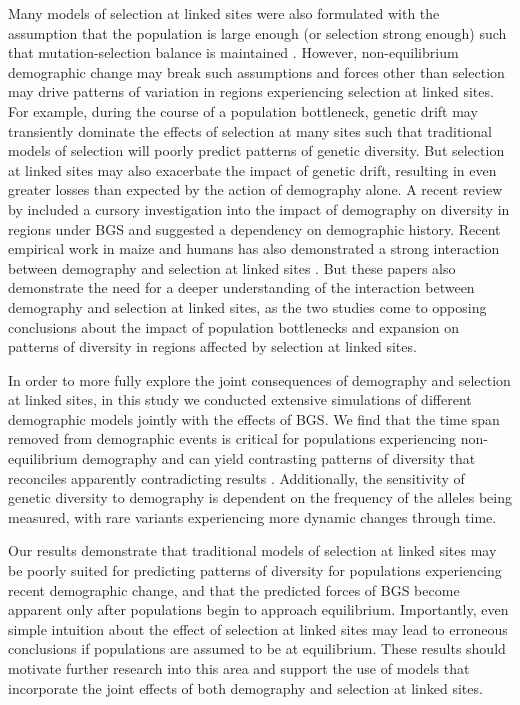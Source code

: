 \documentclass[9pt,twocolumn,twoside]{rilabRxiv}
\begin{document}
Many models of selection at linked sites were also formulated with the assumption that the population is large enough (or selection strong enough) such that mutation-selection balance is maintained \citep{charlesworth1993effect, zeng2013coalescent, nicolaisen2013distortions}.
However, non-equilibrium demographic change may break such assumptions and forces other than selection may drive patterns of variation in regions experiencing selection at linked sites.
For example, during the course of a population bottleneck, genetic drift may transiently dominate the effects of selection at many sites such that traditional models of selection will poorly predict patterns of genetic diversity.
But selection at linked sites may also exacerbate the impact of genetic drift, resulting in even greater losses than expected by the action of demography alone.
A recent review by \citet{comeron2017background} included a cursory investigation into the impact of demography on diversity in regions under BGS and suggested a dependency on demographic history.
Recent empirical work in maize and humans has also demonstrated a strong interaction between demography and selection at linked sites \citep{beissinger2016recent,torres2018human}.
But these papers also demonstrate the need for a deeper understanding of the interaction between demography and selection at linked sites, as the two studies come to opposing conclusions about the impact of population bottlenecks and expansion on patterns of diversity in regions affected by selection at linked sites.

In order to more fully explore the joint consequences of demography and selection at linked sites, in this study we conducted extensive simulations of different demographic models jointly with the effects of BGS.
We find that the time span removed from demographic events is critical for populations experiencing non-equilibrium demography and can yield contrasting patterns of diversity that reconciles apparently contradicting results  \citep{beissinger2016recent,torres2018human}.
Additionally, the sensitivity of genetic diversity to demography is dependent on the frequency of the alleles being measured, with rare variants experiencing more dynamic changes through time.

Our results demonstrate that traditional models of selection at linked sites may be poorly suited for predicting patterns of diversity for populations experiencing recent demographic change, and that the predicted forces of BGS become apparent only after populations begin to approach equilibrium.
Importantly, even simple intuition about the effect of selection at linked sites may lead to erroneous conclusions if populations are assumed to be at equilibrium.
These results should motivate further research into this area and support the use of models that incorporate the joint effects of both demography and selection at linked sites.
\end{document}
